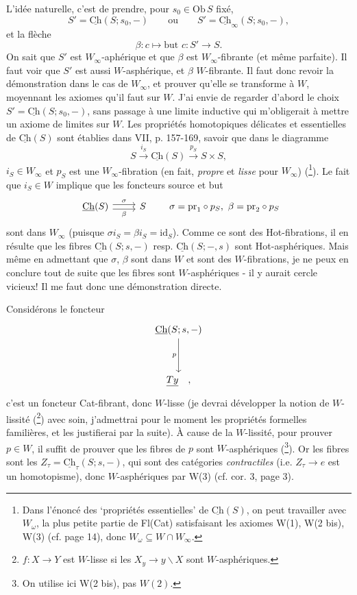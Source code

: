 \documentclass[11pt]{article}
\newcommand{\printedpage}[1]{\marginpar{\footnotesize p.~#1}}
\newcommand{\msp}[1]{\marginpar{\footnotesize [#1]}}
\newcommand{\Ch}{\underline{\mathrm{Ch}}}
\begin{document}
L'idée naturelle, c'est de prendre, pour $s_0 \in \mathrm{Ob}\,S$ fixé,
\[ S' = \Ch(S; s_0, -) \qquad \text{ou} \qquad S' = \Ch_\infty(S; s_0, -), \]
et la flèche
\[ \beta : c \longmapsto \text{but } c : S' \longrightarrow S. \]
On sait que $S'$ est $W_\infty$-aphérique et que $\beta$ est $W_\infty$-fibrante (et même parfaite). Il faut voir que $S'$ est aussi $W$-asphérique, et $\beta$ $W$-fibrante. Il faut donc revoir la démonstration dans le cas de $W_\infty$, et prouver qu'elle se transforme à $W$, %
\msp{page 8}
moyennant les axiomes qu'il faut sur $W$. J'ai envie de regarder d'abord le choix $S' = \Ch(S; s_0, -)$, sans passage à une limite inductive qui m'obligerait à mettre un axiome de limites sur $W$. Les propriétés homotopiques délicates et essentielles de $\Ch(S)$ sont établies dans VII, p. 157-169, savoir que dans le diagramme
\[ S \xrightarrow{i_S} \Ch(S) \xrightarrow{p_S} S \times S, \]
$i_S \in W_\infty$ et $p_S$ est une $W_\infty$-fibration (en fait, \textit{propre} et \textit{lisse} pour $W_\infty$) (\footnote[12]{Dans l'énoncé des ‘propriétés essentielles’ de $\Ch(S)$, on peut travailler avec $W_\omega$, la plus petite partie de Fl(Cat) satisfaisant les axiomes W(1), W(2 bis), W(3) (cf. page 14), donc $W_\omega \subseteq W \cap W_\infty$.}). Le fait que $i_S \in W$ implique que les foncteurs source et but
\[ \begin{tikzcd} \Ch(S) \arrow[r, shift left, "\sigma"] \arrow[r, shift right, "\beta"'] & S \end{tikzcd} \qquad \sigma = \mathrm{pr}_1 \circ p_S,\ \beta = \mathrm{pr}_2 \circ p_S \]
sont dans $W_\infty$ (puisque $\sigma i_S = \beta i_S = \mathrm{id}_S$). Comme ce sont des Hot-fibrations, il en résulte que les fibres $\Ch(S; s, -)$ resp. $\Ch(S; -, s)$ sont Hot-asphériques. Mais même en admettant que $\sigma$, $\beta$ sont dans $W$ et sont des $W$-fibrations, je ne peux en conclure tout de suite que les fibres sont $W$-asphériques - il y aurait cercle vicieux! Il me faut donc une démonstration directe.

Considérons le foncteur
\[
\begin{tikzcd}[row sep=huge]
\Ch(S; s, -) \arrow[d, "p"'] \\
\underline{Ty} \quad ,
\end{tikzcd}
\]
\printedpage{8}
c'est un foncteur Cat-fibrant, donc $W$-lisse (je devrai développer la notion de $W$-lissité (\footnote[13]{$f : X \longrightarrow Y$ est $W$-lisse si les $X_y \longrightarrow y\backslash X$ sont $W$-asphériques.}) avec soin, j'admettrai pour le moment les propriétés formelles familières, et les justifierai par la suite). À cause de la $W$-lissité, pour prouver $p \in W$, il suffit de
\msp{page 9}
prouver que les fibres de $p$ sont $W$-asphériques (\footnote[14]{On utilise ici W(2 bis), pas $W(2)$.}). Or les fibres sont les $Z_\tau = \Ch_\tau(S; s, -)$, qui sont des catégories \textit{contractiles} (i.e. $Z_\tau \longrightarrow e$ est un homotopisme), donc $W$-asphériques par W(3) (cf. cor. 3, page 3).
\end{document}
